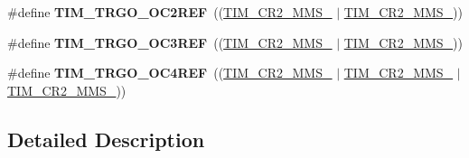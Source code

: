 \begin{DoxyCompactItemize}
\item 
\hypertarget{group___t_i_m___master___mode___selection_gaaedc4b3f4c5c3c8b45a2cf1b73e33c0a}{\#define {\bfseries T\-I\-M\-\_\-\-T\-R\-G\-O\-\_\-\-O\-C2\-R\-E\-F}~((\hyperlink{group___peripheral___registers___bits___definition_gacb74a815afdd856d51cfcf1ddf3fce6a}{T\-I\-M\-\_\-\-C\-R2\-\_\-\-M\-M\-S\-\_} $\vert$ \hyperlink{group___peripheral___registers___bits___definition_gaf3e55308e84106d6501201e66bd46ab6}{T\-I\-M\-\_\-\-C\-R2\-\_\-\-M\-M\-S\-\_}))}\label{group___t_i_m___master___mode___selection_gaaedc4b3f4c5c3c8b45a2cf1b73e33c0a}

\item 
\hypertarget{group___t_i_m___master___mode___selection_ga4bc4791f8b9560950d30078b96d08f55}{\#define {\bfseries T\-I\-M\-\_\-\-T\-R\-G\-O\-\_\-\-O\-C3\-R\-E\-F}~((\hyperlink{group___peripheral___registers___bits___definition_gacb74a815afdd856d51cfcf1ddf3fce6a}{T\-I\-M\-\_\-\-C\-R2\-\_\-\-M\-M\-S\-\_} $\vert$ \hyperlink{group___peripheral___registers___bits___definition_ga4b1036929b0a4ba5bd5cced9b8e0f4c3}{T\-I\-M\-\_\-\-C\-R2\-\_\-\-M\-M\-S\-\_}))}\label{group___t_i_m___master___mode___selection_ga4bc4791f8b9560950d30078b96d08f55}

\item 
\hypertarget{group___t_i_m___master___mode___selection_ga7fe6228adec5d1b6f0a8ed8da111db4d}{\#define {\bfseries T\-I\-M\-\_\-\-T\-R\-G\-O\-\_\-\-O\-C4\-R\-E\-F}~((\hyperlink{group___peripheral___registers___bits___definition_gacb74a815afdd856d51cfcf1ddf3fce6a}{T\-I\-M\-\_\-\-C\-R2\-\_\-\-M\-M\-S\-\_} $\vert$ \hyperlink{group___peripheral___registers___bits___definition_ga4b1036929b0a4ba5bd5cced9b8e0f4c3}{T\-I\-M\-\_\-\-C\-R2\-\_\-\-M\-M\-S\-\_} $\vert$ \hyperlink{group___peripheral___registers___bits___definition_gaf3e55308e84106d6501201e66bd46ab6}{T\-I\-M\-\_\-\-C\-R2\-\_\-\-M\-M\-S\-\_}))}\label{group___t_i_m___master___mode___selection_ga7fe6228adec5d1b6f0a8ed8da111db4d}

\end{DoxyCompactItemize}


\subsection{Detailed Description}
